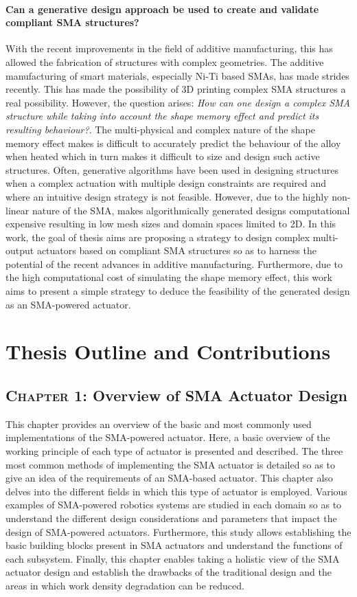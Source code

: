 \paragraph{Can a generative design approach be used to create and validate compliant SMA structures?}
With the recent improvements in the field of additive manufacturing, this has allowed the fabrication of structures with complex geometries. The additive manufacturing of smart materials, especially Ni-Ti based SMAs, has made strides recently. This has made the possibility of 3D printing complex SMA structures a real possibility. However, the question arises: \textit{How can one design a complex SMA structure while taking into account the shape memory effect and predict its resulting behaviour?}. The multi-physical and complex nature of the shape memory effect makes is difficult to accurately predict the behaviour of the alloy when heated which in turn makes it difficult to size and design such active structures. Often, generative algorithms have been used in designing structures when a complex actuation with multiple design constraints are required and where an intuitive design strategy is not feasible. However, due to the highly non-linear nature of the SMA, makes algorithmically generated designs computational expensive resulting in low mesh sizes and domain spaces limited to 2D. In this work, the goal of thesis aims are proposing a strategy to design complex multi-output actuators based on compliant SMA structures so as to harness the potential of the recent advances in additive manufacturing. Furthermore, due to the high computational cost of simulating the shape memory effect, this work aims to present a simple strategy to deduce the feasibility of the generated design as an SMA-powered actuator.

\section*{Thesis Outline and Contributions}
\subsection*{\textsc{Chapter 1}: Overview of SMA Actuator Design}
This chapter provides an overview of the basic and most commonly used implementations of the SMA-powered actuator. Here, a basic overview of the working principle of each type of actuator is presented and described. The three most common methods of implementing the SMA actuator is detailed so as to give an idea of the requirements of an SMA-based actuator. This chapter also delves into the different fields in which this type of actuator is employed. Various examples of SMA-powered robotics systems are studied in each domain so as to understand the different design considerations and parameters that impact the design of SMA-powered actuators. Furthermore, this study allows establishing the basic building blocks present in SMA actuators and understand the functions of each subsystem. Finally, this chapter enables taking a holistic view of the SMA actuator design and establish the drawbacks of the traditional design and the areas in which work density degradation can be reduced.

